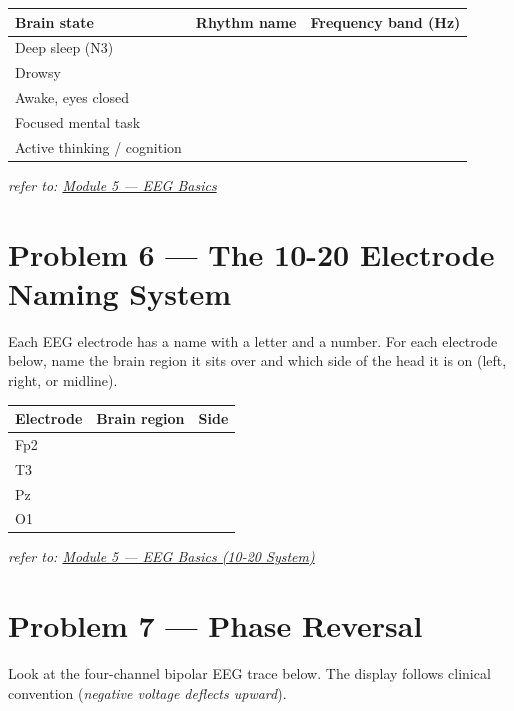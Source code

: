 \documentclass[11pt,letterpaper]{article}
\begin{document}
\vspace{0.6em}
\begin{tabular}{p{4.5cm}p{4cm}p{4.5cm}}
\textbf{Brain state} & \textbf{Rhythm name} & \textbf{Frequency band (Hz)} \\
\hline
\rule{0pt}{1.3em} Deep sleep (N3) &  &  \\[1.3em]
Drowsy &  &  \\[1.3em]
Awake, eyes closed &  &  \\[1.3em]
Focused mental task &  &  \\[1.3em]
Active thinking / cognition &  &  \\[1.3em]
\hline
\end{tabular}

\vspace{2.5cm}
\hfill\textit{\small refer to: \href{https://judepj.github.io/neuro-signals-101/modules/05_eeg_basics.html}{Module 5 — EEG Basics}}

\vfill\pagebreak

\section*{Problem 6 — The 10-20 Electrode Naming System}
Each EEG electrode has a name with a letter and a number. For each electrode
below, name the brain region it sits over and which side of the head it is on
(left, right, or midline).

\vspace{0.4em}
\begin{tabular}{p{2.2cm}p{6cm}p{4cm}}
\textbf{Electrode} & \textbf{Brain region} & \textbf{Side} \\
\hline
\rule{0pt}{1.3em} Fp2 &  &  \\[1.2em]
T3 &  &  \\[1.2em]
Pz &  &  \\[1.2em]
O1 &  &  \\[1.2em]
\hline
\end{tabular}

\vspace{3cm}
\hfill\textit{\small refer to: \href{https://judepj.github.io/neuro-signals-101/modules/05_eeg_basics.html}{Module 5 — EEG Basics (10-20 System)}}

\vfill\pagebreak

\section*{Problem 7 — Phase Reversal}
Look at the four-channel bipolar EEG trace below. The display follows clinical
convention (\emph{negative voltage deflects upward}).
\end{document}
